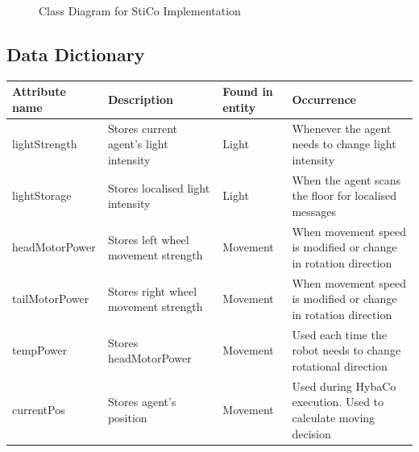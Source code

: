 \begin{figure}[h!] 
  \caption{Class Diagram for StiCo Implementation}
  \label{desSysClassStiCo}
\end{figure}
\clearpage

\begin{landscape}
  \section{Data Dictionary}
  \begin{tabular}{| p{5cm} | p{4cm} | p{3cm} | p{6cm} |}
    \hline
    Attribute name & Description & Found in entity & Occurrence\\
    \hline
    lightStrength  & Stores current agent's light intensity & Light    &
    Whenever the agent needs to change light intensity              \\
    \hline
    lightStorage   & Stores localised light intensity       & Light    &
    When the agent scans the floor for localised messages           \\
    \hline
    headMotorPower & Stores left wheel movement strength    & Movement &
    When movement speed is modified or change in rotation direction \\
    \hline
    tailMotorPower & Stores right wheel movement strength   & Movement &
    When movement speed is modified or change in rotation direction \\
    \hline
    tempPower      & Stores headMotorPower                  & Movement &
    Used each time the robot needs to change rotational direction   \\
    \hline
    currentPos     & Stores agent's position                & Movement &
    Used during HybaCo execution.  Used to calculate moving decision\\
    \hline  
  \end{tabular}
\end{landscape}
\clearpage

